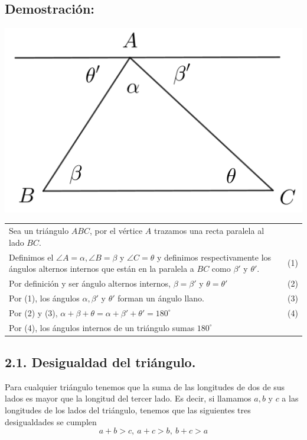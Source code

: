 \documentclass[12pt,a4paper]{article}
\begin{document}
\subsection*{Demostración:}
\begin{center}
\includegraphics[scale=0.7]{demo1.png}
\end{center}
\begin{tabular}{p{15.9cm} p{1cm}}
Sea un triángulo $ABC$, por el vértice $A$ trazamos una recta paralela al lado $BC$. 
\\Definimos el $\angle A=\alpha, \angle B=\beta$ y $\angle C= \theta$ y definimos respectivamente los  ángulos alternos internos que están en la paralela a $BC$ como $\beta '$ y $\theta '$. & \medskip (1)
\\Por definición y ser ángulo alternos internos, $\beta= \beta '$ y $\theta=\theta '$ &(2)
\\Por (1), los ángulos $\alpha,\beta'$ y $\theta'$ forman un ángulo llano. & (3)
\\Por (2) y (3), $\alpha + \beta+ \theta = \alpha + \beta '+ \theta ' = 180^ \circ$ &(4)
\\Por (4), los  ángulos internos de un triángulo sumas $180^\circ$
\end{tabular}
\subsection*{2.1. Desigualdad del triángulo.}
Para cualquier triángulo tenemos que la suma de las longitudes de dos de sus lados es mayor que la longitud del tercer lado. Es decir, si llamamos $a, b$ y $c$ a las longitudes de los lados del triángulo, tenemos que las siguientes tres desigualdades se cumplen
$$a+b>c, \> a+c>b, \> b+c>a$$
\end{document}
